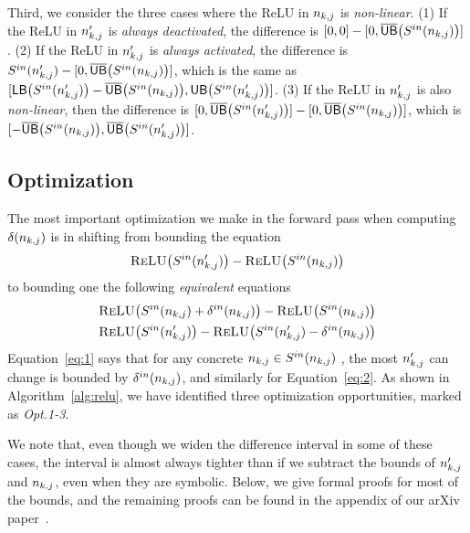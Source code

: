 Third, we consider the three cases where the ReLU in $n_{k,j}$
is \emph{non-linear}.
%
(1) If the ReLU in $ n'_{k,j} $ is \emph{always deactivated}, the
difference is $[0,0] - [0, \overline{\mathsf{UB}}\big(S^{in}(n_{k,j})\big)]$.
%
(2) If the ReLU in $ n'_{k,j} $ is \emph{always activated}, the
difference is $S^{in}(n'_{k,j}) - [0,
\overline{\mathsf{UB}}\big(S^{in}(n_{k,j})\big)]$, which is the same as
$[ \mathsf{LB}\big(S^{in}(n'_{k,j})\big)-\overline{\mathsf{UB}}\big(S^{in}(n_{k,j})\big), \mathsf{UB}\big(S^{in}(n'_{k,j})\big)
]$.
%
%
(3) If the ReLU in $n'_{k,j}$ is also \emph{non-linear}, then the
difference is $[0, \overline{\mathsf{UB}}\big(S^{in}(n'_{k,j})\big)] - [0,
\overline{\mathsf{UB}}\big(S^{in}(n_{k,j})\big)]$, which is  $[-\overline{\mathsf{UB}}\big(S^{in}(n_{k,j})\big),
\overline{\mathsf{UB}}\big(S^{in}(n'_{k,j})\big)]$.



\subsection{Optimization}
\label{sec:opt}
\newcommand{\R}[1]{\proc{ReLU}\big(#1\big)}
The most important optimization we make in the forward pass when computing
$ \delta(n_{k,j}) $ is in shifting from bounding the equation
\[
\R{\ReluIN{\np}} - \R{\ReluIN{\n}}
\]
to bounding one the following \textit{equivalent} equations
\begin{align}
\R{\ReluIN{\n} + \ReluINdelta{\n}} - \R{\ReluIN{\n}} \label{eq:1}\\
\R{\ReluIN{\np}} - \R{\ReluIN{\np} - \ReluINdelta{\n}} \label{eq:2}
\end{align}
Equation~\ref{eq:1} says that for any concrete $ n_{k,j} \in S^{in}(n_{k,j}) $
, the most $ n'_{k,j} $ can change is bounded by $ \delta^{in}(n_{k,j}) $,
and similarly for Equation~\ref{eq:2}.
As shown in Algorithm~\ref{alg:relu}, we have identified three
optimization opportunities, marked as \emph{Opt.1-3}. We note that,
even though we widen the difference
interval in some of these cases, the interval is almost always tighter
than if we subtract the bounds of $ n'_{k,j} $ and $ n_{k,j} $, even when they
are symbolic. Below, we give formal proofs for most of the bounds,
and the remaining proofs can be found in the appendix
of our arXiv paper~\cite{arxivPaper}.

